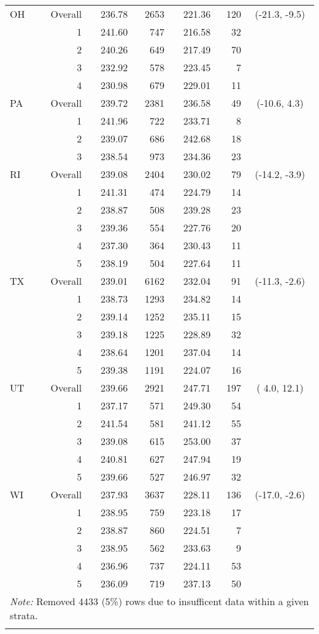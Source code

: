 \begin{longtable}{lrrr@{\extracolsep{.25cm}}rrc}
   \hline
OH & Overall & 236.78 & 2653 & 221.36 & 120 & (-21.3,  -9.5) \\ 
   & 1 & 241.60 & 747 & 216.58 &  32 &  \\ 
   & 2 & 240.26 & 649 & 217.49 &  70 &  \\ 
   & 3 & 232.92 & 578 & 223.45 &   7 &  \\ 
   & 4 & 230.98 & 679 & 229.01 &  11 &  \\ 
   \hline
PA & Overall & 239.72 & 2381 & 236.58 &  49 & (-10.6,   4.3) \\ 
   & 1 & 241.96 & 722 & 233.71 &   8 &  \\ 
   & 2 & 239.07 & 686 & 242.68 &  18 &  \\ 
   & 3 & 238.54 & 973 & 234.36 &  23 &  \\ 
   \hline
RI & Overall & 239.08 & 2404 & 230.02 &  79 & (-14.2,  -3.9) \\ 
   & 1 & 241.31 & 474 & 224.79 &  14 &  \\ 
   & 2 & 238.87 & 508 & 239.28 &  23 &  \\ 
   & 3 & 239.36 & 554 & 227.76 &  20 &  \\ 
   & 4 & 237.30 & 364 & 230.43 &  11 &  \\ 
   & 5 & 238.19 & 504 & 227.64 &  11 &  \\ 
   \hline
TX & Overall & 239.01 & 6162 & 232.04 &  91 & (-11.3,  -2.6) \\ 
   & 1 & 238.73 & 1293 & 234.82 &  14 &  \\ 
   & 2 & 239.14 & 1252 & 235.11 &  15 &  \\ 
   & 3 & 239.18 & 1225 & 228.89 &  32 &  \\ 
   & 4 & 238.64 & 1201 & 237.04 &  14 &  \\ 
   & 5 & 239.38 & 1191 & 224.07 &  16 &  \\ 
   \hline
UT & Overall & 239.66 & 2921 & 247.71 & 197 & (  4.0,  12.1) \\ 
   & 1 & 237.17 & 571 & 249.30 &  54 &  \\ 
   & 2 & 241.54 & 581 & 241.12 &  55 &  \\ 
   & 3 & 239.08 & 615 & 253.00 &  37 &  \\ 
   & 4 & 240.81 & 627 & 247.94 &  19 &  \\ 
   & 5 & 239.66 & 527 & 246.97 &  32 &  \\ 
   \hline
WI & Overall & 237.93 & 3637 & 228.11 & 136 & (-17.0,  -2.6) \\ 
   & 1 & 238.95 & 759 & 223.18 &  17 &  \\ 
   & 2 & 238.87 & 860 & 224.51 &   7 &  \\ 
   & 3 & 238.95 & 562 & 233.63 &   9 &  \\ 
   & 4 & 236.96 & 737 & 224.11 &  53 &  \\ 
   & 5 & 236.09 & 719 & 237.13 &  50 &  \\ 
   \hline \multicolumn{7}{l}{\textit{Note:} Removed 4433 (5\%) rows due to insufficent data within a given strata.} \\\hline
\label{g4math-mlpsa-lrAIC}
\end{longtable}
